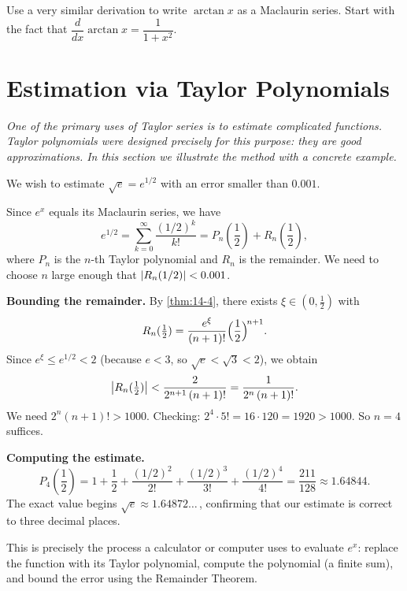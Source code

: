 \begin{remark}
Use a very similar derivation to write $\arctan x$ as a Maclaurin series.  Start with the fact that $\dfrac{d}{dx}\arctan x = \dfrac{1}{1+x^{2}}$.
\end{remark}

\section{Estimation via Taylor Polynomials}
\label{sec:14.11}

\textit{One of the primary uses of Taylor series is to estimate complicated functions.  Taylor polynomials were designed precisely for this purpose: they are good approximations.  In this section we illustrate the method with a concrete example.}

\begin{example}
\label{ex:14-10}
We wish to estimate $\sqrt{e}=e^{1/2}$ with an error smaller than $0.001$.

Since $e^{x}$ equals its Maclaurin series, we have
\[
  e^{1/2}
  = \sum_{k=0}^{\infty}\frac{(1/2)^{k}}{k!}
  = P_{n}({\textstyle\frac{1}{2}}) + R_{n}({\textstyle\frac{1}{2}}),
\]
where $P_{n}$ is the $n$-th Taylor polynomial and $R_{n}$ is the remainder.  We need to choose $n$ large enough that $\left\lvert R_{n}(1/2) \right\rvert<0.001$.

\textbf{Bounding the remainder.}  By \cref{thm:14-4}, there exists $\xi\in(0,\frac{1}{2})$ with
\[
  R_{n}({\textstyle\frac{1}{2}})
  = \frac{e^{\xi}}{(n+1)!}\Bigl(\frac{1}{2}\Bigr)^{\!n+1}.
\]
Since $e^{\xi}\le e^{1/2}<2$ (because $e<3$, so $\sqrt{e}<\sqrt{3}<2$), we obtain
\[
  \left\lvert R_{n}({\textstyle\frac{1}{2}}) \right\rvert
  < \frac{2}{2^{n+1}\,(n+1)!}
  = \frac{1}{2^{n}\,(n+1)!}.
\]
We need $2^{n}(n+1)!>1000$.  Checking: $2^{4}\cdot 5!=16\cdot 120=1920>1000$.  So $n=4$ suffices.

\textbf{Computing the estimate.}
\[
  P_{4}({\textstyle\frac{1}{2}})
  = 1 + \frac{1}{2} + \frac{(1/2)^{2}}{2!} + \frac{(1/2)^{3}}{3!} + \frac{(1/2)^{4}}{4!}
  = \frac{211}{128}
  \approx 1.64844.
\]
The exact value begins $\sqrt{e}\approx 1.64872\ldots$\,, confirming that our estimate is correct to three decimal places.
\end{example}

\begin{remark}
This is precisely the process a calculator or computer uses to evaluate $e^{x}$: replace the function with its Taylor polynomial, compute the polynomial (a finite sum), and bound the error using the Remainder Theorem.
\end{remark}

